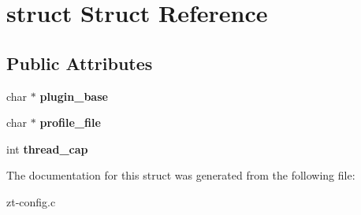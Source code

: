 \hypertarget{structstruct}{\section{struct Struct Reference}
\label{structstruct}
}
\subsection*{Public Attributes}
\begin{DoxyCompactItemize}
\item 
\hypertarget{structstruct_ab6713628d358ac0e73684ab5496d9a24}{char $\ast$ {\bfseries plugin\-\_\-base}}\label{structstruct_ab6713628d358ac0e73684ab5496d9a24}

\item 
\hypertarget{structstruct_afaf81d8a3fb01cf29227155154a542bf}{char $\ast$ {\bfseries profile\-\_\-file}}\label{structstruct_afaf81d8a3fb01cf29227155154a542bf}

\item 
\hypertarget{structstruct_accaf8d8c28c7bb758b5af3371d1e3292}{int {\bfseries thread\-\_\-cap}}\label{structstruct_accaf8d8c28c7bb758b5af3371d1e3292}

\end{DoxyCompactItemize}


The documentation for this struct was generated from the following file\-:\begin{DoxyCompactItemize}
\item 
zt-\/config.\-c\end{DoxyCompactItemize}
